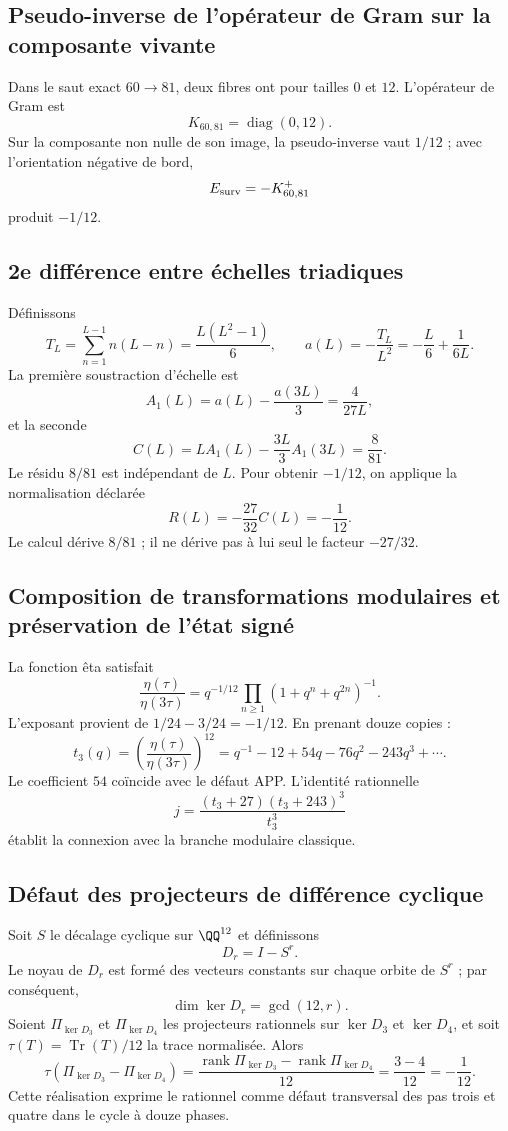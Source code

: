 \subsection{Pseudo-inverse de l’opérateur de Gram sur la composante vivante}

Dans le saut exact \(60\to81\), deux fibres ont pour tailles \(0\) et
\(12\). L’opérateur de Gram est
\[
K_{60,81}=\operatorname{diag}(0,12).
\]
Sur la composante non nulle de son image, la pseudo-inverse vaut \(1/12\) ; avec l’orientation
négative de bord,
\[
E_{\rm surv}=-K_{60,81}^{+}
\]
produit \(-1/12\).

\subsection{2e différence entre échelles triadiques}
\label{sec:c12-segunda-diferencia-triadica}

Définissons
\[
T_L=\sum_{n=1}^{L-1}n(L-n)=\frac{L(L^2-1)}6,
\qquad
a(L)=-\frac{T_L}{L^2}=-\frac L6+\frac1{6L}.
\]
La première soustraction d’échelle est
\[
A_1(L)=a(L)-\frac{a(3L)}3=\frac4{27L},
\]
et la seconde
\[
C(L)=LA_1(L)-\frac{3L}{3}A_1(3L)=\frac8{81}.
\]
Le résidu \(8/81\) est indépendant de \(L\). Pour obtenir
\(-1/12\), on applique la normalisation déclarée
\[
R(L)=-\frac{27}{32}C(L)=-\frac1{12}.
\]
Le calcul dérive \(8/81\) ; il ne dérive pas à lui seul le facteur \(-27/32\).

\subsection{Composition de transformations modulaires et préservation de l'état signé}

La fonction êta satisfait
\[
\frac{\eta(\tau)}{\eta(3\tau)}
=q^{-1/12}\prod_{n\ge1}(1+q^n+q^{2n})^{-1}.
\]
L’exposant provient de \(1/24-3/24=-1/12\). En prenant douze copies :
\[
t_3(q)=\left(\frac{\eta(\tau)}{\eta(3\tau)}\right)^{12}
=q^{-1}-12+54q-76q^2-243q^3+\cdots.
\]
Le coefficient \(54\) coïncide avec le défaut APP\@. L’identité rationnelle
\[
j=\frac{(t_3+27)(t_3+243)^3}{t_3^3}
\]
établit la connexion avec la branche modulaire classique.

\subsection{Défaut des projecteurs de différence cyclique}

Soit \(S\) le décalage cyclique sur \(\QQ^{12}\) et définissons
\[
 D_r=I-S^r.
\]
Le noyau de \(D_r\) est formé des vecteurs constants sur chaque orbite
de \(S^r\) ; par conséquent,
\[
 \dim\ker D_r=\gcd(12,r).
\]
Soient \(\Pi_{\ker D_3}\) et \(\Pi_{\ker D_4}\) les projecteurs rationnels sur
\(\ker D_3\) et \(\ker D_4\), et soit
\(\tau(T)=\operatorname{Tr}(T)/12\) la trace normalisée. Alors
\[
 \boxed{
 \tau(\Pi_{\ker D_3}-\Pi_{\ker D_4})
 =\frac{\operatorname{rank}\Pi_{\ker D_3}
       -\operatorname{rank}\Pi_{\ker D_4}}{12}
 =\frac{3-4}{12}
 =-\frac1{12}.}
\]
Cette réalisation exprime le rationnel comme défaut transversal des pas
trois et quatre dans le cycle à douze phases.

